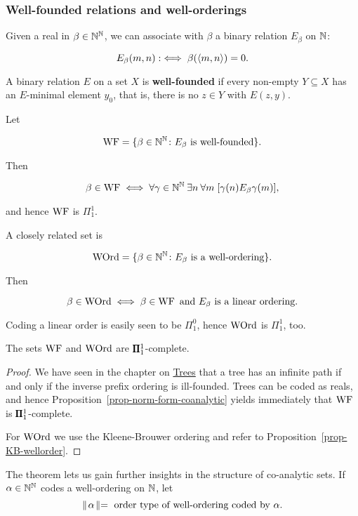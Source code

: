 \subsubsection{Well-founded relations and well-orderings}\label{sec-well-founded}

Given a real in $\beta \in \mathbb{N}^{\mathbb{N}}$, we can associate with $\beta$ a binary relation $E_\beta$ on $\mathbb{N}$:

\begin{equation}
E_\beta(m,n) :\iff \beta(\langle m,n \rangle) = 0.
\end{equation}

A binary relation $E$ on a set $X$ is \textbf{well-founded} if every non-empty $Y \subseteq X$ has an $E$-minimal element $y_0$, that is, there is no $z \in Y$ with $E(z,y)$.

Let

\begin{equation}
\operatorname{WF} = \{\beta \in \mathbb{N}^{\mathbb{N}} \colon \text{$E_\beta$ is well-founded} \}.
\end{equation}

Then

\begin{equation}
\beta \in \operatorname{WF} \iff \forall \gamma \in \mathbb{N}^{\mathbb{N}} \: \exists n \: \forall m \; [ \gamma(n) E_\beta \gamma(m) ],
\end{equation}

and hence $\operatorname{WF}$ is $\Pi^1_1$.

A closely related set is

\begin{equation}
\operatorname{WOrd} = \{\beta \in \mathbb{N}^{\mathbb{N}} \colon \text{$E_\beta$ is a well-ordering} \}.
\end{equation}

Then

\begin{equation}
\beta \in \operatorname{WOrd} \iff \beta \in \operatorname{WF}  \text{ and $E_\beta$ is a linear ordering}.
\end{equation}

Coding a linear order is easily seen to be $\Pi^0_1$, hence $\operatorname{WOrd}$ is $\Pi^1_1$, too.

\begin{theorem}\label{thm-wf-wadge-complete}The sets $\operatorname{WF}$ and $\operatorname{WOrd}$ are $\pmb{\Pi}^1_{1}$-complete.

\end{theorem}\begin{proof}We have seen in the chapter on \href{/trees}{Trees} that a tree has an infinite path  if and only if the inverse prefix ordering is ill-founded. Trees can be coded as reals, and hence Proposition~\ref{prop-norm-form-coanalytic} yields immediately that $\operatorname{WF}$ is $\pmb{\Pi}^1_{1}$-complete.

For $\operatorname{WOrd}$ we use the Kleene-Brouwer ordering and refer to Proposition~\ref{prop-KB-wellorder}.

\end{proof}The theorem lets us gain further insights in the structure of co-analytic sets. If $\alpha \in \mathbb{N}^{\mathbb{N}}$ codes a well-ordering on $\mathbb{N}$, let
\begin{equation*}
\parallel \! \alpha \!\parallel = \text{ order type of well-ordering coded by $\alpha$}.
\end{equation*}

